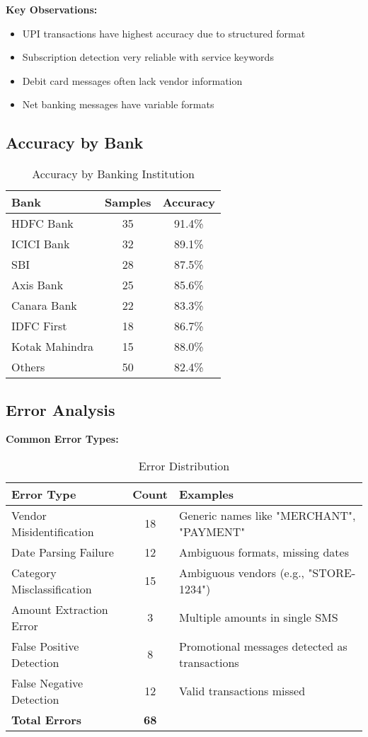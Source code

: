 \documentclass[11pt,a4paper]{report}
\begin{document}
\textbf{Key Observations:}
\begin{itemize}
    \item UPI transactions have highest accuracy due to structured format
    \item Subscription detection very reliable with service keywords
    \item Debit card messages often lack vendor information
    \item Net banking messages have variable formats
\end{itemize}

\subsection{Accuracy by Bank}

\begin{table}[H]
\centering
\caption{Accuracy by Banking Institution}
\begin{tabular}{|l|c|c|}
\hline
\textbf{Bank} & \textbf{Samples} & \textbf{Accuracy} \\
\hline
HDFC Bank & 35 & 91.4\% \\
ICICI Bank & 32 & 89.1\% \\
SBI & 28 & 87.5\% \\
Axis Bank & 25 & 85.6\% \\
Canara Bank & 22 & 83.3\% \\
IDFC First & 18 & 86.7\% \\
Kotak Mahindra & 15 & 88.0\% \\
Others & 50 & 82.4\% \\
\hline
\end{tabular}
\end{table}

\subsection{Error Analysis}

\textbf{Common Error Types:}

\begin{table}[H]
\centering
\caption{Error Distribution}
\begin{tabular}{|l|c|L{6cm}|}
\hline
\textbf{Error Type} & \textbf{Count} & \textbf{Examples} \\
\hline
Vendor Misidentification & 18 & Generic names like "MERCHANT", "PAYMENT" \\
Date Parsing Failure & 12 & Ambiguous formats, missing dates \\
Category Misclassification & 15 & Ambiguous vendors (e.g., "STORE-1234") \\
Amount Extraction Error & 3 & Multiple amounts in single SMS \\
False Positive Detection & 8 & Promotional messages detected as transactions \\
False Negative Detection & 12 & Valid transactions missed \\
\hline
\textbf{Total Errors} & \textbf{68} & \\
\hline
\end{tabular}
\end{table}
\end{document}
